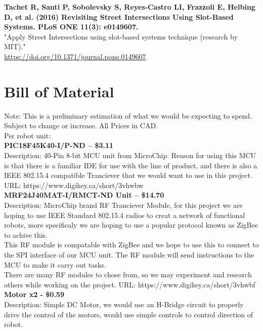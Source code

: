 \documentclass[a4paper]{article}
\begin{document}
	\textbf{Tachet R, Santi P, Sobolevsky S, Reyes-Castro LI, Frazzoli E, Helbing D, et al. (2016) Revisiting Street Intersections Using Slot-Based Systems. PLoS ONE 11(3): e0149607.}\\
	"Apply Street Intersections using slot-based systems technique (research by MIT)."\\
	\href{URL}{https://doi.org/10.1371/journal.pone.0149607}\\
	
	\section*{Bill of Material}
	Note: This is a preliminary estimation of what we would be expecting to spend. Subject to change or increase. All Prices in CAD. \\
	Per robot unit: \\
	
	\textbf{PIC18F45K40-I/P-ND – \$3.11} \\
	Description: 40-Pin 8-bit MCU unit from MicroChip. Reason for using this MCU is that there is a familiar IDE for use with the line of product, and there is also a IEEE 802.15.4 compatible Tranciever that we would want to use in this project.
	URL: https://www.digikey.ca/short/3vhwbw \\
	
	\textbf{MRF24J40MAT-I/RMCT-ND Unit – \$14.70} \\
	Description: MicroChip brand RF Tranciever Module, for this project we are hoping to use IEEE Standard 802.15.4 radios to creat a network of functional robots, more specificaly we are hoping to use a popular protocol known as ZigBee to achive this. \\
	
	This RF module is compatable with ZigBee and we hope to use this to connect to the SPI interface of our MCU unit. The RF module will send instructions to the MCU to make it carry out tasks. \\
	
	There are many RF modules to chose from, so we may experiment and research others while working on the project.
	URL: https://www.digikey.ca/short/3vhwbf \\
	
	
	\textbf{Motor x2 - \$0.59} \\
	Description: Simple DC Motor, we would use an H-Bridge circuit to properly drive the control of the motors, would use simple controls to control direction of robot. \\ \\
	
\end{document}
